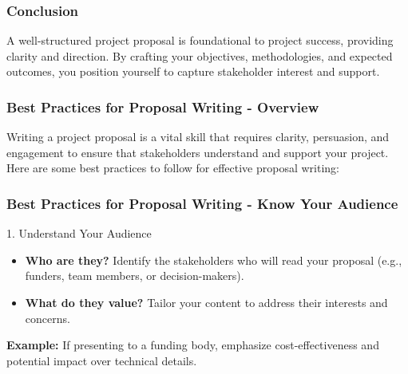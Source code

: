 \documentclass[aspectratio=169]{beamer}
\begin{document}
\begin{frame}[fragile]
    \frametitle{Conclusion}
    A well-structured project proposal is foundational to project success, providing clarity and direction. By crafting your objectives, methodologies, and expected outcomes, you position yourself to capture stakeholder interest and support.
\end{frame}

\begin{frame}[fragile]
    \frametitle{Best Practices for Proposal Writing - Overview}
    Writing a project proposal is a vital skill that requires clarity, persuasion, and engagement to ensure that stakeholders understand and support your project. Here are some best practices to follow for effective proposal writing:
\end{frame}

\begin{frame}[fragile]
    \frametitle{Best Practices for Proposal Writing - Know Your Audience}
    \begin{block}{1. Understand Your Audience}
        \begin{itemize}
            \item \textbf{Who are they?} Identify the stakeholders who will read your proposal (e.g., funders, team members, or decision-makers).
            \item \textbf{What do they value?} Tailor your content to address their interests and concerns.
        \end{itemize}
        \textbf{Example:} If presenting to a funding body, emphasize cost-effectiveness and potential impact over technical details.
    \end{block}
\end{frame}
\end{document}
